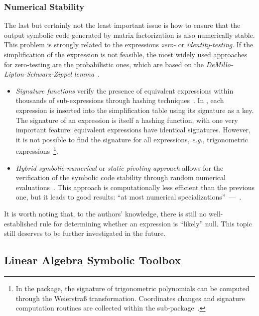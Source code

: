 \subsubsection{Numerical Stability}

The last but certainly not the least important issue is how to ensure that the output symbolic code generated by matrix factorization is also numerically stable. This problem is strongly related to the expressions \emph{zero-} or \emph{identity-testing}. If the simplification of the expression is not feasible, the most widely used approaches for zero-testing are the probabilistic ones, which are based on the \emph{DeMillo-Lipton-Schwarz-Zippel lemma}~\cite{demillo1978probabilistic,schwartz1980fast,zippel1979probabilistic}.
%
\begin{itemize}
    \item \emph{Signature functions} verify the presence of equivalent expressions within thousands of sub-expressions through hashing techniques~\cite{char1984design,gonnet1984determining,gonnet1986results,monagan1994signature}. In \Maple{}, each expression is inserted into the simplification table using its signature as a key. The signature of an expression is itself a hashing function, with one very important feature: equivalent expressions have identical signatures. However, it is not possible to find the signature for all expressions, \emph{e.g.}, trigonometric expressions~\cite{cox1994ideals,zhou2005implicit}\footnote{In the \LEM{} package, the signature of trigonometric polynomials can be computed through the Weierstra{\ss} transformation. Coordinates changes and signature computation routines are collected within the \SIG{} sub-package~\cite{lem2023source}.}.
    \item \emph{Hybrid symbolic-numerical} or \emph{static pivoting approach} allows for the verification of the symbolic code stability through random numerical evaluations~\cite{giesbrecht2014symbolic,li1998making}. This approach is computationally less efficient than the previous one, but it leads to good results: ``at most numerical specializations''~---~\cite{giesbrecht2014symbolic}.
\end{itemize}
%
It is worth noting that, to the authors' knowledge, there is still no well-established rule for determining whether an expression is ``likely'' null. This topic still deserves to be further investigated in the future.

\subsection{Linear Algebra Symbolic Toolbox}

